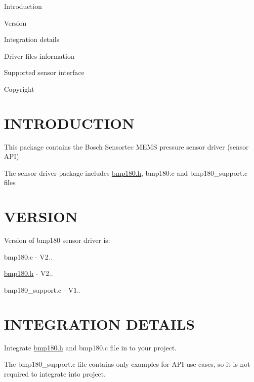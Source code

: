 
\begin{DoxyItemize}
\item Introduction
\item Version
\item Integration details
\item Driver files information
\item Supported sensor interface
\item Copyright
\end{DoxyItemize}

\section*{I\+N\+T\+R\+O\+D\+U\+C\+T\+I\+ON }


\begin{DoxyItemize}
\item This package contains the Bosch Sensortec M\+E\+MS pressure sensor driver (sensor A\+PI)
\item The sensor driver package includes \hyperlink{bmp180_8h}{bmp180.\+h}, bmp180.\+c and bmp180\+\_\+support.\+c files
\end{DoxyItemize}

\section*{V\+E\+R\+S\+I\+ON }


\begin{DoxyItemize}
\item Version of bmp180 sensor driver is\+:
\begin{DoxyItemize}
\item bmp180.\+c -\/ V2..
\item \hyperlink{bmp180_8h}{bmp180.\+h} -\/ V2..
\item bmp180\+\_\+support.\+c -\/ V1..
\end{DoxyItemize}
\end{DoxyItemize}

\section*{I\+N\+T\+E\+G\+R\+A\+T\+I\+ON D\+E\+T\+A\+I\+LS }


\begin{DoxyItemize}
\item Integrate \hyperlink{bmp180_8h}{bmp180.\+h} and bmp180.\+c file in to your project.
\item The bmp180\+\_\+support.\+c file contains only examples for A\+PI use cases, so it is not required to integrate into project.
\end{DoxyItemize}

